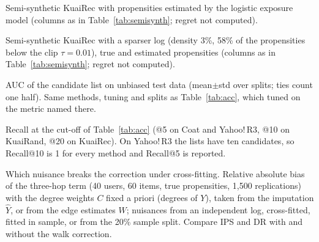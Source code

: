 \documentclass[preprint,review,12pt,authoryear]{elsarticle}
\theoremstyle{definition}
\begin{document}
\begin{table}[h]\centering\small
\caption{Semi-synthetic KuaiRec with propensities estimated by the logistic
exposure model (columns as in Table~\ref{tab:semisynth}; regret not computed).}\label{tab:semisynthest}
\begin{adjustbox}{max width=\textwidth}

\end{adjustbox}
\end{table}

\begin{table}[h]\centering\small
\caption{Semi-synthetic KuaiRec with a sparser log (density 3\%, 58\% of the
propensities below the clip $\tau=0.01$), true and estimated propensities
(columns as in Table~\ref{tab:semisynth}; regret not computed).}\label{tab:semisynthsparse}
\begin{adjustbox}{max width=\textwidth}

\end{adjustbox}
\end{table}

\begin{table}[p]\centering\scriptsize
\caption{AUC of the candidate list on unbiased test data (mean$\pm$std over splits; ties count one half). Same methods, tuning and splits as Table~\ref{tab:acc}, which tuned on the metric named there.}\label{tab:auc}
\begin{adjustbox}{max width=\textwidth}

\end{adjustbox}
\end{table}

\begin{table}[p]\centering\scriptsize
\caption{Recall at the cut-off of Table~\ref{tab:acc} (@5 on Coat and Yahoo!\,R3, @10 on KuaiRand, @20 on KuaiRec). On Yahoo!\,R3 the lists have ten candidates, so Recall@10 is 1 for every method and Recall@5 is reported.}\label{tab:recall}
\begin{adjustbox}{max width=\textwidth}

\end{adjustbox}
\end{table}

\begin{table}[t]\centering\small
\caption{Which nuisance breaks the correction under cross-fitting. Relative absolute bias of the three-hop term
(40 users, 60 items, true propensities, 1{,}500 replications) with the degree weights $C$ fixed a priori
(degrees of $Y$), taken from the imputation $\hat Y$, or from the edge estimates $W$; nuisances from an
independent log, cross-fitted, fitted in sample, or from the 20\% sample split. Compare IPS and DR with
and without the walk correction.}\label{tab:protocolfixed}
\begin{adjustbox}{max width=\textwidth}

\end{adjustbox}
\end{table}
\end{document}
